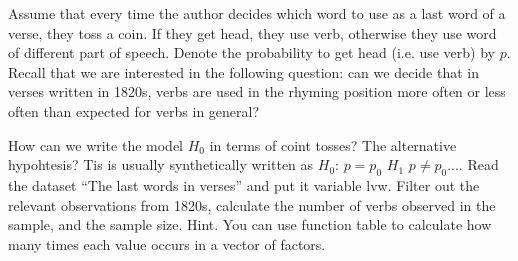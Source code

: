 \begin{ExerciseList}
\begin{knitrout}
\end{knitrout}
	\Question
	Assume that every time the author decides which word to use as a last word of a verse, they toss a coin. If they get head, they use verb, otherwise they use word of different part of speech. Denote the probability to get head (i.e. use verb) by $p$. Recall that we are interested in the following question: can we decide that in verses written in 1820s, verbs are used in the rhyming position more often or less often than expected for verbs in general?
	
	How can we write the model $H_0$ in terms of coint tosses? The alternative hypohtesis? 
	Tis is usually synthetically written as 	
	$H_0$: $p = p_0$ $H_1$ $p \neq p_0$....
	\Question
	Read the dataset “The last words in verses” and put it variable lvw. Filter out the relevant observations from 1820s, calculate the number of verbs observed in the sample, and the sample size.
	Hint. You can use function table to calculate how many times each value occurs in a vector of factors.
\begin{knitrout}
\color{fgcolor}\begin{kframe}
\begin{alltt}
         \hlkwb{<-} \hldef{(}\hldef{)}
\end{alltt}



\end{kframe}
\end{knitrout}
\end{ExerciseList}
